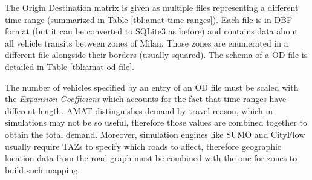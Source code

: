 \begin{table}[H]
  \label{tbl:amat-turns-file}
\end{table}

\putimagecouple
{}
{}

The Origin Destination matrix is given as multiple files representing a different time range (summarized in Table \ref{tbl:amat-time-ranges}).
Each file is in DBF format (but it can be converted to SQLite3 as before) and contains data about all vehicle transits between zones of Milan.
Those zones are enumerated in a different file alongside their borders (usually squared).
The schema of a OD file is detailed in Table \ref{tbl:amat-od-file}.

The number of vehicles specified by an entry of an OD file must be scaled with the \textit{Expansion Coefficient} which accounts for the fact that time ranges have different length.
AMAT distinguishes demand by travel reason, which in simulations may not be so useful, therefore those values are combined together to obtain the total demand.
Moreover, simulation engines like SUMO and CityFlow usually require TAZs to specify which roads to affect, therefore geographic location data from the road graph must be combined with the one for zones to build such mapping.

